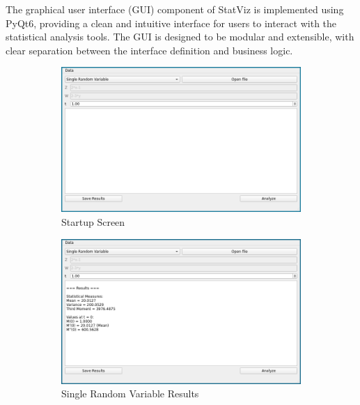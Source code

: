 \documentclass{article}
\begin{document}
The graphical user interface (GUI) component of StatViz is implemented using PyQt6, providing a clean and intuitive interface for users to interact with the statistical analysis tools. The GUI is designed to be modular and extensible, with clear separation between the interface definition and business logic.

\begin{figure}[H]
  \begin{subfigure}{0.45\textwidth}
    \centering
    \includegraphics[width=\textwidth]{figures/startup.png}
    \caption{Startup Screen}
  \end{subfigure}
  \hfill
  \begin{subfigure}{0.45\textwidth}
    \centering
    \includegraphics[width=\textwidth]{figures/single-results.png}
    \caption{Single Random Variable Results}
  \end{subfigure}
  \vspace{1em}
  \begin{subfigure}{0.45\textwidth}
    \centering

\end{subfigure}
\end{figure}
\end{document}

